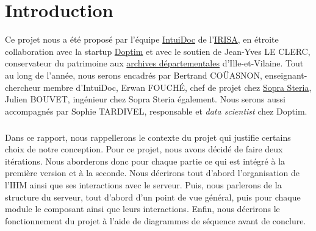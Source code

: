 \chapter{Introduction}
\setcounter{page}{1}
\pagestyle{fancy}
\fancyhf{}
\cfoot[\thepage]{\thepage}

Ce projet nous a été proposé par l’équipe \href{https://www-intuidoc.irisa.fr/}{IntuiDoc} de l’\href{https://www.irisa.fr/}{IRISA}, en étroite collaboration avec la startup \href{http://www.doptim.eu}{Doptim} et avec le soutien de Jean-Yves LE CLERC, conservateur du patrimoine aux \href{http://archives.ille-et-vilaine.fr/fr}{archives départementales} d'Ille-et-Vilaine. Tout au long de l’année, nous serons encadrés par Bertrand COÜASNON, enseignant-chercheur membre d'IntuiDoc, Erwan FOUCHÉ, chef de projet chez \href{https://www.soprasteria.com/fr}{Sopra Steria}, Julien BOUVET, ingénieur chez Sopra Steria également. Nous serons aussi accompagnés par Sophie TARDIVEL, responsable et \textit{data scientist} chez Doptim.

\paragraph{}
Dans ce rapport, nous rappellerons le contexte du projet qui justifie certains choix de notre conception. Pour ce projet, nous avons décidé de faire deux itérations. Nous aborderons donc pour chaque partie ce qui est intégré à la première version et à la seconde. Nous décrirons tout d'abord l'organisation de l'IHM ainsi que ses interactions avec le serveur. Puis, nous parlerons de la structure du serveur, tout d'abord d'un point de vue général, puis pour chaque module le composant ainsi que leurs interactions. Enfin, nous décrirons le fonctionnement du projet à l'aide de diagrammes de séquence avant de conclure.